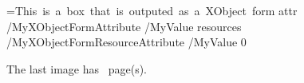 =\hbox{This is a box that is outputed as a XObject form}
\pdfxform                  
   attr {/MyXObjectFormAttribute /MyValue} 
   resources {/MyXObjectFormResourceAttribute /MyValue} 
   0


\hbox{\pdfrefxform \pdflastxform}

\newpage

%



The last image has \the\pdflastximagepages\ page(s).



